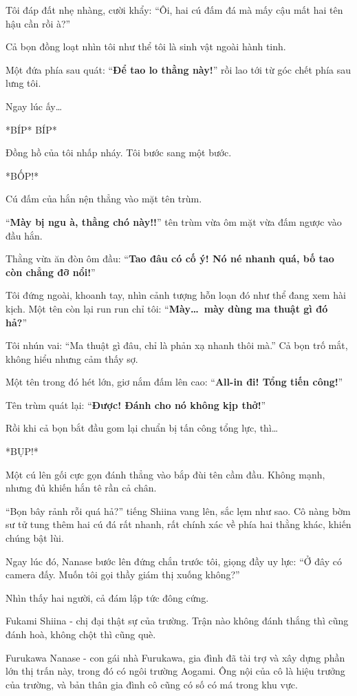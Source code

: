 \documentclass[../main.tex]{subfiles}
\begin{document}
Tôi đáp đất nhẹ nhàng, cười khẩy: ``Ôi, hai cú đấm đá mà mấy cậu mất hai tên hậu cần rồi à?''

Cả bọn đồng loạt nhìn tôi như thể tôi là sinh vật ngoài hành tinh.

Một đứa phía sau quát: ``\textbf{Để tao lo thằng này!}'' rồi lao tới từ góc chết phía sau lưng tôi.

Ngay lúc ấy\dots

*BÍP* BÍP*

Đồng hồ của tôi nhấp nháy. Tôi bước sang một bước.

*BỐP!*

Cú đấm của hắn nện thẳng vào mặt tên trùm.

``\textbf{Mày bị ngu à, thằng chó này!!}'' tên trùm vừa ôm mặt vừa đấm ngược vào đầu hắn.

Thằng vừa ăn đòn ôm đầu: ``\textbf{Tao đâu có cố ý! Nó né nhanh quá, bố tao còn chẳng đỡ nổi!}''

Tôi đứng ngoài, khoanh tay, nhìn cảnh tượng hỗn loạn đó như thể đang xem hài kịch. Một tên còn lại run run chỉ tôi: ``\textbf{Mày\dots\ mày dùng ma thuật gì đó hả?}''

Tôi nhún vai: ``Ma thuật gì đâu, chỉ là phản xạ nhanh thôi mà.'' Cả bọn trố mắt, không hiểu nhưng cảm thấy sợ.

Một tên trong đó hét lớn, giơ nắm đấm lên cao: ``\textbf{All-in đi! Tổng tiến công!}''

Tên trùm quát lại: ``\textbf{Được! Đánh cho nó không kịp thở!}''

Rồi khi cả bọn bắt đầu gom lại chuẩn bị tấn công tổng lực, thì\dots

*BỤP!*

Một cú lên gối cực gọn đánh thẳng vào bắp đùi tên cầm đầu. Không mạnh, nhưng đủ khiến hắn tê rần cả chân.

``Bọn bây rảnh rỗi quá hả?'' tiếng Shiina vang lên, sắc lẹm như sao. Cô nàng bờm sư tử tung thêm hai cú đá rất nhanh, rất chính xác về phía hai thằng khác, khiến chúng bật lùi.

Ngay lúc đó, Nanase bước lên đứng chắn trước tôi, giọng đầy uy lực: ``Ở đây có camera đấy. Muốn tôi gọi thầy giám thị xuống không?''

Nhìn thấy hai người, cả đám lập tức đông cứng.

Fukami Shiina - chị đại thật sự của trường. Trận nào không đánh thắng thì cũng đánh hoà, không chột thì cũng què.

Furukawa Nanase - con gái nhà Furukawa, gia đình đã tài trợ và xây dựng phần lớn thị trấn này, trong đó có ngôi trường Aogami. Ông nội của cô là hiệu trưởng của trường, và bản thân gia đình cô cũng có số có má trong khu vực.
\end{document}
